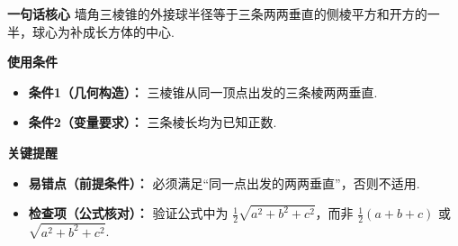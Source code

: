 \begin{summarybox}
	\textbf{\textcolor{CSummary}{一句话核心}}
	墙角三棱锥的外接球半径等于三条两两垂直的侧棱平方和开方的一半，球心为补成长方体的中心.

	\medskip
	\textbf{\textcolor{CSummary}{使用条件}}
	\begin{itemize}[leftmargin=*, itemsep=0.5em, topsep=0.4em]
		\item \textbf{条件1（几何构造）：} 三棱锥从同一顶点出发的三条棱两两垂直.
		\item \textbf{条件2（变量要求）：} 三条棱长均为已知正数.
	\end{itemize}

	\medskip
	\textbf{\textcolor{CSummary}{关键提醒}}
	\begin{itemize}[leftmargin=*, itemsep=0.5em, topsep=0.4em]
		\item \textbf{易错点（前提条件）：} 必须满足“同一点出发的两两垂直”，否则不适用.
		\item \textbf{检查项（公式核对）：} 验证公式中为 $\frac12\sqrt{a^2+b^2+c^2}$，而非 $\frac12(a+b+c)$ 或 $\sqrt{a^2+b^2+c^2}$.
	\end{itemize}

\end{summarybox}
